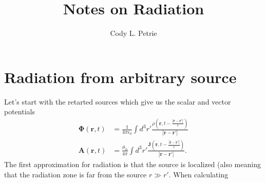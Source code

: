 \documentclass[12pt]{article}
\title{Notes on Radiation}
\author{Cody L. Petrie}
\newcommand{\wavr}{\left|\mathbf{r}-\mathbf{r}'\right|}
\newcommand{\br}{\mathbf{r}}
\newcommand{\tret}{t-\frac{\wavr}{c}}
\begin{document}
\maketitle

\section*{Radiation from arbitrary source}
Let's start with the retarted sources which give us the scalar and vector potentials
\begin{align}
   \mathbf{\Phi}(\br,t) &= \frac{1}{4\pi\epsilon_0} \int d^3r' \frac{\rho(\br,\tret)}{\wavr} \\
   \mathbf{A}(\br,t) &= \frac{\mu_0}{4\pi} \int d^3r' \frac{\mathbf{J}(\br,\tret)}{\wavr}.
\end{align}
The first approximation for radiation is that the source is localized (also meaning that the radiation zone is far from the source $r \gg r'$. When calculating
\end{document}
